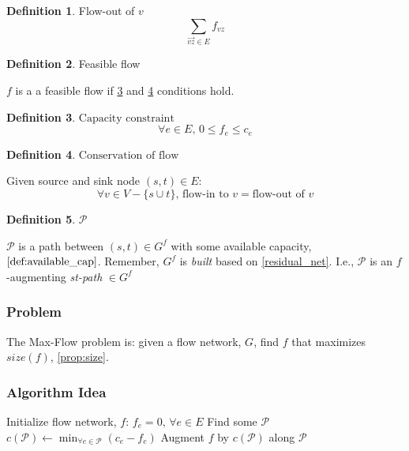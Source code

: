 \documentclass{article}
\theoremstyle{definition}
\newtheorem{definition}{Definition}[section]
\begin{document}
\begin{definition}{Flow-out of $v$}
\label{def:flowout}
$$\sum_{\overrightarrow{vz} \in E}{f_{vz}}$$
\end{definition}

\begin{definition}{Feasible flow}
	
	$f$ is a a feasible flow if \ref{prop:capacity} and \ref{prop:conservation} conditions hold.
\end{definition}

\begin{definition}{$\text{Capacity constraint}$}
\label{prop:capacity}
$$\forall e \in E, \, 0 \leq f_e \leq c_e$$
\end{definition}

\begin{definition}{$\text{Conservation of flow}$}
\label{prop:conservation}

Given source and sink node $(s,t) \in E$:
$$\forall v \in V - \{s \cup t\}, \, \text{flow-in to } v = \text{flow-out of } v$$ 
\end{definition}

\begin{definition}{$\mathcal{P}$}
\label{prop:cal_p}	

	$\mathcal{P}$ is a path between $(s,t) \in G^f$ with some available capacity, $\ref{def:available_cap}$. Remember, $G^f$ is \textit{built} based on \ref{residual_net}. I.e., $\mathcal{P}$ is an $f$-augmenting \textit{st-path} $\in G^f$
\end{definition}

\subsubsection{Problem}
The Max-Flow problem is: given a flow network, $G$, find $f$ that maximizes $size(f)$, \ref{prop:size}.

\subsubsection{Algorithm Idea}
\begin{algorithm}
\caption{$NaiveMaxFlow$}
\label{alg:naive_max_flow}
\begin{algorithmic}[1]
	\STATE Initialize flow network, $f$: $f_e = 0, \, \forall e \in E$
	\STATE Find some $\mathcal{P}$ 
		\STATE $c(\mathcal{P}) \gets \min_{\forall e \in \mathcal{P}} (c_e-f_e)$
		\STATE Augment $f$ by $c(\mathcal{P})$ along $\mathcal{P}$
	\ENDWHILE
\end{algorithmic}
\end{algorithm}
\end{document}
